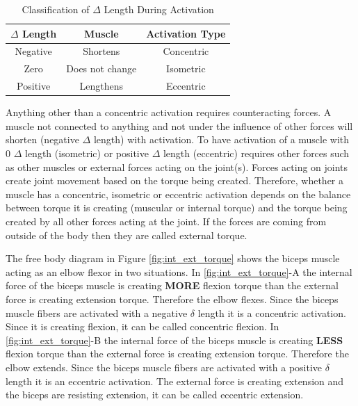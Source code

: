 \begin{table}[h!]
\centering
\begin{tabular}{||c c c ||} 
 \hline
 $\Delta$ Length & Muscle & Activation Type \\ [0.5ex] 
 \hline\hline
 Negative & Shortens & Concentric \\
 Zero & Does not change & Isometric \\[1ex] 
 Positive & Lengthens & Eccentric \\[1ex] 
 \hline
\end{tabular}
\caption{Classification of $\Delta$ Length During Activation}
\label{table:contraction_types}
\end{table}


Anything other than a concentric activation requires counteracting forces. A muscle not connected to anything and not under the influence of other forces will shorten (negative $\Delta$ length) with activation. To have activation of a muscle with 0 $\Delta$ length (isometric) or positive $\Delta$ length (eccentric) requires other forces such as other muscles or external forces acting on the joint(s). Forces acting on joints create joint movement based on the torque being created. Therefore, whether a muscle has a concentric, isometric or eccentric activation depends on the balance between torque it is creating (muscular or internal torque) and the torque being created by all other forces acting at the joint. If the forces are coming from outside of the body then they are called external torque. 

\vspace{0.2cm} 
The free body diagram in Figure \ref{fig:int_ext_torque} shows the biceps muscle acting as an elbow flexor in two situations. In  \ref{fig:int_ext_torque}-A the internal force of the biceps muscle is creating \textbf{MORE} flexion torque than the external force is creating extension torque. Therefore the elbow flexes. Since the biceps muscle fibers are activated with a negative $\delta$ length it is a concentric activation. Since it is creating flexion, it can be called concentric flexion. In  \ref{fig:int_ext_torque}-B the internal force of the biceps muscle is creating \textbf{LESS} flexion torque than the external force is creating extension torque. Therefore the elbow extends. Since the biceps muscle fibers are activated with a positive $\delta$ length it is an eccentric activation. The external force is creating extension and the biceps are resisting extension, it can be called eccentric extension.

